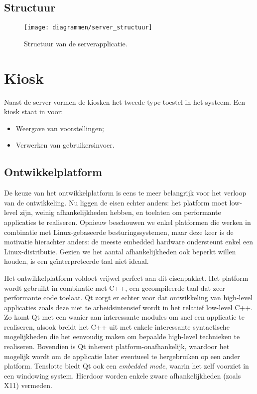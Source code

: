 \subsection{Structuur}

\begin{figure}
	\texttt{[image: diagrammen/server\_structuur]}
	\caption{Structuur van de serverapplicatie.}
\end{figure}

\section{Kiosk}
\label{ontwerp:applicatie:kiosk}

Naast de server vormen de kiosken het tweede type toestel in het systeem. Een kiosk staat in voor:
\begin{itemize}
\item Weergave van voorstellingen;
\item Verwerken van gebruikersinvoer.
\end{itemize}

\subsection{Ontwikkelplatform}

De keuze van het ontwikkelplatform is eens te meer belangrijk voor het verloop van de ontwikkeling. Nu liggen de eisen echter anders: het platform moet low-level zijn, weinig afhankelijkheden hebben, en toelaten om performante applicaties te realiseren. Opnieuw beschouwen we enkel platformen die werken in combinatie met Linux-gebaseerde besturingssystemen, maar deze keer is de motivatie hierachter anders: de meeste embedded hardware ondersteunt enkel een Linux-distributie. Gezien we het aantal afhankelijkheden ook beperkt willen houden, is een geïnterpreteerde taal niet ideaal.

Het ontwikkelplatform  voldoet vrijwel perfect aan dit eisenpakket. Het platform wordt gebruikt in combinatie met C++, een gecompileerde taal dat zeer performante code toelaat. Qt zorgt er echter voor dat ontwikkeling van high-level applicaties zoals deze niet te arbeidsintensief wordt in het relatief low-level C++. Zo komt Qt met een waaier aan interessante modules om snel een applicatie te realiseren, alsook breidt het C++ uit met enkele interessante syntactische mogelijkheden die het eenvoudig maken om bepaalde high-level technieken te realiseren. Bovendien is Qt inherent platform-onafhankelijk, waardoor het mogelijk wordt om de applicatie later eventueel te hergebruiken op een ander platform. Tenslotte biedt Qt ook een \emph{embedded mode}, waarin het zelf voorziet in een windowing system. Hierdoor worden enkele zware afhankelijkheden (zoals X11) vermeden.

